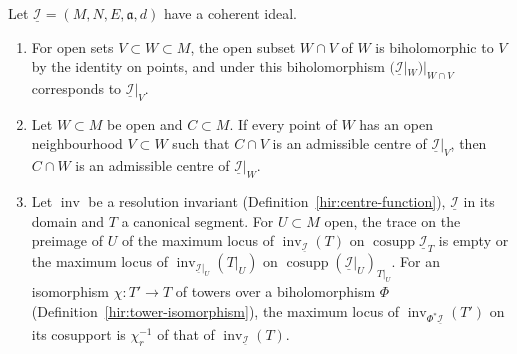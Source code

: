 \begin{lemma}
\label{bcalc:centre-local}
\mixedleanok
Let \(\underline{\mathcal I}=(M,N,E,\mathfrak a,d)\) have a coherent ideal.
\begin{enumerate}
\item For open sets \(V\subset W\subset M\), the open subset \(W\cap V\) of \(W\) is biholomorphic to \(V\) by the identity on points, and under this
biholomorphism \((\underline{\mathcal I}|_W)|_{W\cap V}\) corresponds to \(\underline{\mathcal I}|_V\).
\item Let \(W\subset M\) be open and \(C\subset M\). If every point of \(W\) has an open neighbourhood \(V\subset W\) such that \(C\cap V\) is an admissible centre of
\(\underline{\mathcal I}|_V\), then \(C\cap W\) is an admissible centre of \(\underline{\mathcal I}|_W\).
\item Let \(\operatorname{inv}\) be a resolution invariant (Definition~\ref{hir:centre-function}), \(\underline{\mathcal I}\) in its domain and \(T\) a canonical segment. For
\(U\subset M\) open, the trace on the preimage of \(U\) of the maximum locus of \(\operatorname{inv}_{\underline{\mathcal I}}(T)\) on \(\operatorname{cosupp}\underline{\mathcal I}_T\) is
empty or the maximum locus of \(\operatorname{inv}_{\underline{\mathcal I}|_U}(T|_U)\) on \(\operatorname{cosupp}(\underline{\mathcal I}|_U)_{T|_U}\). For an isomorphism
\(\chi\colon T'\to T\) of towers over a biholomorphism \(\Phi\) (Definition~\ref{hir:tower-isomorphism}), the maximum locus of
\(\operatorname{inv}_{\Phi^*\underline{\mathcal I}}(T')\) on its cosupport is \(\chi_r^{-1}\) of that of \(\operatorname{inv}_{\underline{\mathcal I}}(T)\).
\end{enumerate}
\end{lemma}
